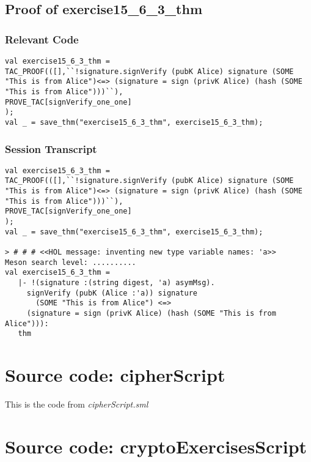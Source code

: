 \documentclass{report}
\begin{document}
\section{Proof of exercise15_6_3_thm}
\label{proof-5}

\subsection{Relevant Code}
\label{rel-code-5}
\begin{lstlisting}[frame=TBlr]
val exercise15_6_3_thm =
TAC_PROOF(([],``!signature.signVerify (pubK Alice) signature (SOME "This is from Alice")<=> (signature = sign (privK Alice) (hash (SOME "This is from Alice")))``),
PROVE_TAC[signVerify_one_one]
);
val _ = save_thm("exercise15_6_3_thm", exercise15_6_3_thm);

\end{lstlisting}

\subsection{Session Transcript}
\label{trans5}
\begin{session}
  \begin{scriptsize}
\begin{verbatim}
val exercise15_6_3_thm =
TAC_PROOF(([],``!signature.signVerify (pubK Alice) signature (SOME "This is from Alice")<=> (signature = sign (privK Alice) (hash (SOME "This is from Alice")))``),
PROVE_TAC[signVerify_one_one]
);
val _ = save_thm("exercise15_6_3_thm", exercise15_6_3_thm);

> # # # <<HOL message: inventing new type variable names: 'a>>
Meson search level: ..........
val exercise15_6_3_thm =
   |- !(signature :(string digest, 'a) asymMsg).
     signVerify (pubK (Alice :'a)) signature
       (SOME "This is from Alice") <=>
     (signature = sign (privK Alice) (hash (SOME "This is from Alice"))):
   thm
\end{verbatim}
  \end{scriptsize}
\end{session}





\appendix{}

\chapter{Source code: cipherScript}
\label{cha:source-code-1}
This is the code from \textit{cipherScript.sml}


\chapter{Source code: cryptoExercisesScript}
\label{cha:source-code-2}

\end{document}
